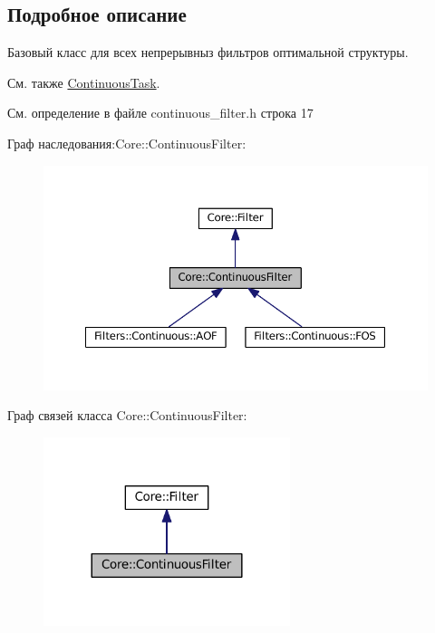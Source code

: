 \subsection{Подробное описание}
Базовый класс для всех непрерывныз фильтров оптимальной структуры. 

\begin{DoxySeeAlso}{См. также}
\hyperlink{class_core_1_1_continuous_task}{Continuous\+Task}. 
\end{DoxySeeAlso}


См. определение в файле continuous\+\_\+filter.\+h строка 17



Граф наследования\+:Core\+:\+:Continuous\+Filter\+:\nopagebreak
\begin{figure}[H]
\begin{center}
\leavevmode
\includegraphics[width=350pt]{class_core_1_1_continuous_filter__inherit__graph}
\end{center}
\end{figure}


Граф связей класса Core\+:\+:Continuous\+Filter\+:\nopagebreak
\begin{figure}[H]
\begin{center}
\leavevmode
\includegraphics[width=204pt]{class_core_1_1_continuous_filter__coll__graph}
\end{center}
\end{figure}


